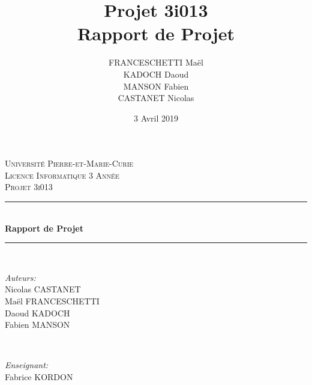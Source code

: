\documentclass{article}
\date{3 Avril 2019}
\author{FRANCESCHETTI Maël\\KADOCH Daoud\\MANSON Fabien\\CASTANET Nicolas}
\title{\LARGE{Projet 3i013\\}Rapport de Projet}
\begin{document}
\begin{titlepage}

\newcommand{\HRule}{\rule{\linewidth}{0.5mm}} %

\center %
 

\textsc{\LARGE Université Pierre-et-Marie-Curie}\\[3cm] %
\textsc{\Large Licence Informatique 3 Année}\\[0.5cm] %
\textsc{\large Projet 3i013}\\[2cm] %


\HRule \\[0.4cm]
{ \huge \bfseries Rapport de Projet}\\[0.4cm] %
\HRule \\[2cm]
 

\begin{minipage}{0.4\textwidth}
	\begin{flushleft} \large
	\emph{Auteurs:}\\[0.2cm]
	Nicolas \textsc{CASTANET}\\ %
	Maël \textsc{FRANCESCHETTI}\\ %
	Daoud \textsc{KADOCH}\\ %
	Fabien \textsc{MANSON} %
	\end{flushleft}
\end{minipage}
~
\begin{minipage}{0.4\textwidth}
	\begin{flushright} \large
	\emph{Enseignant:} \\[0.2cm]
	Fabrice \textsc{KORDON}
	\end{flushright}
\end{minipage}\\[4cm]


\end{titlepage}
\end{document}
